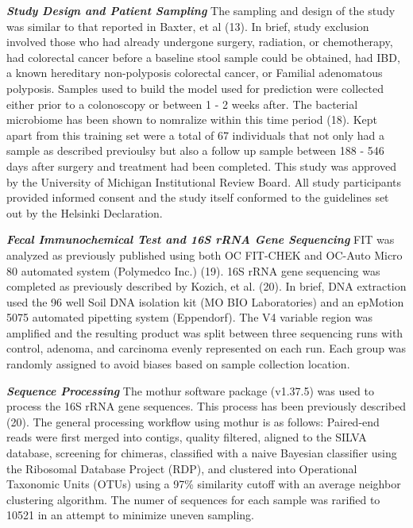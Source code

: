 \documentclass[12pt,]{article}
\begin{document}
\textbf{\emph{Study Design and Patient Sampling}} The sampling and
design of the study was similar to that reported in Baxter, et al (13).
In brief, study exclusion involved those who had already undergone
surgery, radiation, or chemotherapy, had colorectal cancer before a
baseline stool sample could be obtained, had IBD, a known hereditary
non-polyposis colorectal cancer, or Familial adenomatous polyposis.
Samples used to build the model used for prediction were collected
either prior to a colonoscopy or between 1 - 2 weeks after. The
bacterial microbiome has been shown to nomralize within this time period
(18). Kept apart from this training set were a total of 67 individuals
that not only had a sample as described previoulsy but also a follow up
sample between 188 - 546 days after surgery and treatment had been
completed. This study was approved by the University of Michigan
Institutional Review Board. All study participants provided informed
consent and the study itself conformed to the guidelines set out by the
Helsinki Declaration.

\textbf{\emph{Fecal Immunochemical Test and 16S rRNA Gene Sequencing}}
FIT was analyzed as previously published using both OC FIT-CHEK and
OC-Auto Micro 80 automated system (Polymedco Inc.) (19). 16S rRNA gene
sequencing was completed as previously described by Kozich, et al. (20).
In brief, DNA extraction used the 96 well Soil DNA isolation kit (MO BIO
Laboratories) and an epMotion 5075 automated pipetting system
(Eppendorf). The V4 variable region was amplified and the resulting
product was split between three sequencing runs with control, adenoma,
and carcinoma evenly represented on each run. Each group was randomly
assigned to avoid biases based on sample collection location.

\textbf{\emph{Sequence Processing}} The mothur software package
(v1.37.5) was used to process the 16S rRNA gene sequences. This process
has been previously described (20). The general processing workflow
using mothur is as follows: Paired-end reads were first merged into
contigs, quality filtered, aligned to the SILVA database, screening for
chimeras, classified with a naive Bayesian classifier using the
Ribosomal Database Project (RDP), and clustered into Operational
Taxonomic Units (OTUs) using a 97\% similarity cutoff with an average
neighbor clustering algorithm. The numer of sequences for each sample
was rarified to 10521 in an attempt to minimize uneven sampling.
\end{document}
